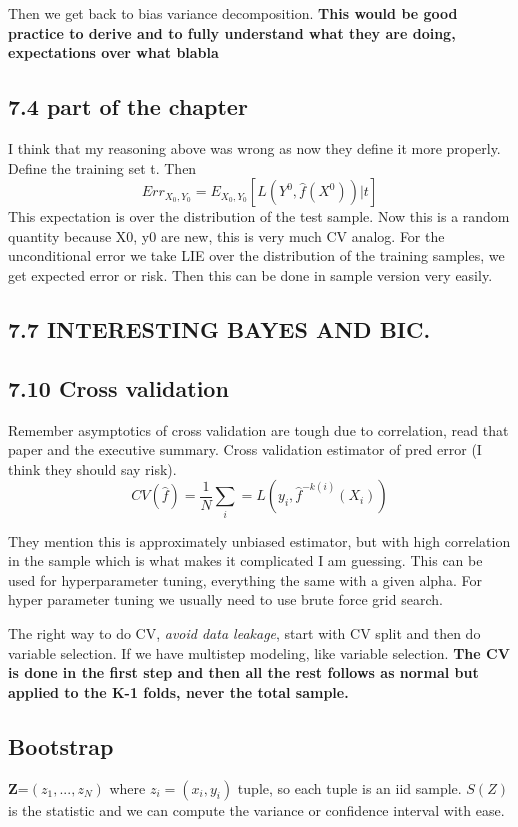 \documentclass{article}
\begin{document}
Then we get back to bias variance decomposition. 
\textbf{This would be good practice to derive and to fully understand what they are doing, expectations over what blabla}

\subsection{7.4 part of the chapter}

I think that my reasoning above was wrong as now they define it more properly.
Define the training set t.
Then $$Err_{X_0,Y_0}= E_{X_0,Y_0}[L(Y^0,\hat{f}(X^0))|t]$$
This expectation is over the distribution of the test sample. Now this is a random quantity because X0, y0 are new, this is very much CV analog.
For the unconditional error we take LIE over the distribution of the training samples, we get expected error or risk. Then this can be done in sample version very easily.
\subsection{7.7 INTERESTING BAYES AND BIC.}


\subsection{7.10 Cross validation}
Remember asymptotics of cross validation are tough due to correlation, read that paper and the executive summary.
Cross validation estimator of pred error (I think they should say risk). $$CV(\hat{f})=\frac{1}{N}\sum_i=L(y_i,\hat{f}^{-k(i)}(X_i))$$

They mention this is approximately unbiased estimator, but with high correlation in the sample which is what makes it complicated I am guessing.
This can be used for hyperparameter tuning, everything the same with a given alpha. 
For hyper parameter tuning we usually need to use brute force grid search.

The right way to do CV, \textit{avoid data leakage}, start with CV split and then do variable selection. 
If we have multistep modeling, like variable selection. \textbf{The CV is done in the first step and then all the rest follows as normal but applied to the K-1 folds, never the total sample.}

\subsection{Bootstrap}
\textbf{Z}=$(z_1,...,z_N)$ where $z_i = (x_i,y_i)$ tuple, so each tuple is an iid sample.
$S(Z) $ is the statistic and we can compute the variance or confidence interval with ease.
\end{document}
